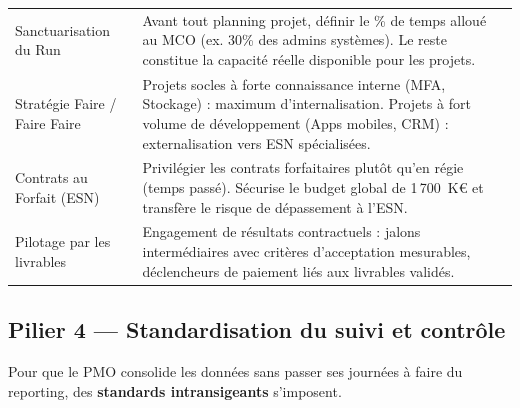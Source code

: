 \documentclass[11pt,a4paper,oneside]{report}
\begin{document}
\vspace{4pt}
\begin{center}
\renewcommand{\arraystretch}{1.5}
\begin{tabularx}{\textwidth}{L{4cm} L{10cm}}
\toprule
{}
 &  \\
\midrule
Sanctuarisation du Run & Avant tout planning projet, définir le \% de temps alloué au MCO (ex. 30\% des admins systèmes). Le reste constitue la capacité réelle disponible pour les projets. \\
Stratégie Faire / Faire Faire & Projets socles à forte connaissance interne (MFA, Stockage) : maximum d'internalisation. Projets à fort volume de développement (Apps mobiles, CRM) : externalisation vers ESN spécialisées. \\
Contrats au Forfait (ESN) & Privilégier les contrats forfaitaires plutôt qu'en régie (temps passé). Sécurise le budget global de 1\,700~K€ et transfère le risque de dépassement à l'ESN. \\
Pilotage par les livrables & Engagement de résultats contractuels : jalons intermédiaires avec critères d'acceptation mesurables, déclencheurs de paiement liés aux livrables validés. \\
\bottomrule
\end{tabularx}
\end{center}

\subsection{Pilier 4 — Standardisation du suivi et contrôle}

Pour que le PMO consolide les données sans passer ses journées à faire du reporting, des \textbf{standards intransigeants} s'imposent.
\end{document}
